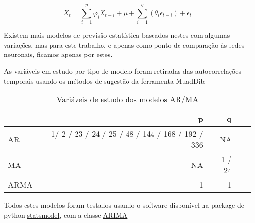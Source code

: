 \begin{equation} \label{eq:arma} 
    X_{t} = \sum_{i=1}^{p}\varphi_{i} X_{t-i}  + \mu + \sum_{i=1}^{q}(\theta_{i} \epsilon_{t-i}) + \epsilon_{t}
\end{equation}
\smallskip

Existem mais modelos de previsão estatística baseados nestes com algumas variações, mas para este trabalho, e apenas como ponto de comparação às redes neuronais, ficamos apenas por estes.\par
As variáveis em estudo por tipo de modelo foram retiradas das autocorrelações temporais usando os métodos de sugestão da ferramenta \hyperref[se:muaddib]{MuadDib}:\\


\begin{table}[h] \centering
\begin{tabular}{lrrrr}
    \toprule
     & p & q \\
    \midrule
    \gls{AR} & 1/ 2 / 23 / 24 / 25 / 48 / 144 / 168 / 192 / 336 & NA \\
    \gls{MA} & NA & 1 / 24 \\
    \gls{ARMA} & 1 & 1 \\
    \bottomrule
    \end{tabular}
    \label{tab:varsstats} 
    \caption{Variáveis de estudo dos modelos AR/MA}
\end{table}


Todos estes modelos foram testados usando o software disponível na package de python \href{https://www.statsmodels.org/stable/index.html}{statsmodel}, com a classe \href{https://www.statsmodels.org/stable/generated/statsmodels.tsa.arima.model.ARIMA.html}{ARIMA}.
